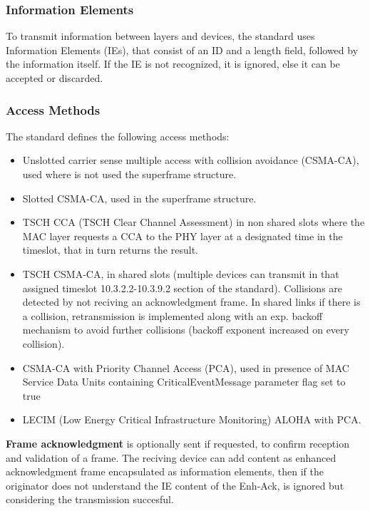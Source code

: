 \documentclass[conference]{IEEEtran}
\begin{document}
\subsubsection{Information Elements}
To transmit information between layers and devices, the standard\cite{10794632} uses Information Elements 
(IEs), that consist of an ID and a length field, followed by the information itself. If the
IE is not recognized, it is ignored, else it can be accepted or discarded.\\

\subsubsection{Access Methods}
The standard\cite{10794632} defines the following access methods:
\begin{itemize}
    \item Unslotted carrier sense multiple access with collision avoidance (CSMA-CA), 
          used where is not used the superframe structure.
    \item Slotted CSMA-CA, used in the superframe structure.
    \item TSCH CCA (TSCH Clear Channel Assessment) in non shared slots where the MAC layer requests a CCA
          to the PHY layer at a designated time in the timeslot,
          that in turn returns the result.
    \item TSCH CSMA-CA, in shared slots (multiple devices can transmit in that assigned 
          timeslot 10.3.2.2-10.3.9.2 section of the standard\cite{10794632}). Collisions are detected by not
          reciving an acknowledgment frame. In shared links if there is a collision, 
          retransmission is implemented along with an exp. backoff mechanism to avoid further
          collisions (backoff exponent increased on every collision).
    \item CSMA-CA with Priority Channel Access (PCA), used in presence of MAC Service Data 
          Units containing CriticalEventMessage parameter flag set to true
    \item LECIM (Low Energy Critical Infrastructure Monitoring) ALOHA with PCA.
\end{itemize}

\textbf{Frame acknowledgment} is optionally sent if requested, to confirm reception and
validation of a frame. The reciving device can add content as enhanced acknowledgment frame
encapsulated as information elements, then if the originator does not understand the IE 
content of the Enh-Ack, is ignored but considering the transmission succesful.\\
\end{document}
